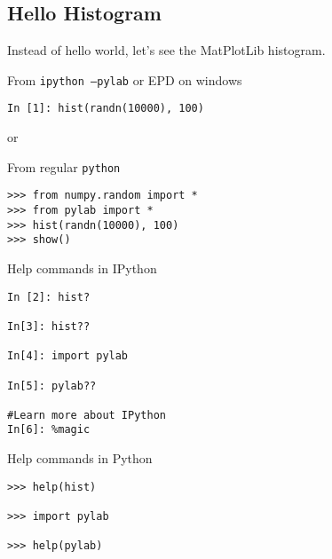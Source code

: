\subsection*{Hello Histogram}

\begin{frame}[fragile]
Instead of hello world, let's see the MatPlotLib histogram.
\begin{block}{From {\tt ipython --pylab} or EPD on windows}
\begin{verbatim}
In [1]: hist(randn(10000), 100)
\end{verbatim}
\end{block}

or

\begin{block}{From regular {\tt python}}
\begin{verbatim}
>>> from numpy.random import *
>>> from pylab import *
>>> hist(randn(10000), 100)
>>> show()
\end{verbatim}
\end{block}

\end{frame}

\begin{frame}[fragile]
\begin{block}{Help commands in IPython}
\begin{verbatim}
In [2]: hist?

In[3]: hist??

In[4]: import pylab

In[5]: pylab??

#Learn more about IPython
In[6]: %magic
\end{verbatim}
\end{block}
\end{frame}

\begin{frame}[fragile]
\begin{block}{Help commands in Python}
\begin{verbatim}
>>> help(hist)

>>> import pylab

>>> help(pylab)
\end{verbatim}
\end{block}
\end{frame}

